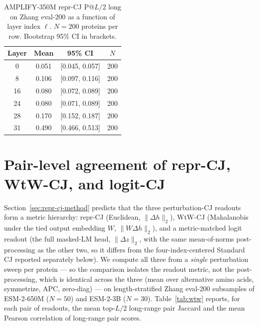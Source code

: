 \documentclass{article}
\begin{document}
\begin{table}[h]
\centering
\small
\caption{AMPLIFY-350M repr-CJ $\text{P}@L/2 \text{ long}$ on Zhang eval-200 as a
function of layer index $\ell$. $N=200$ proteins per row. Bootstrap 95\% CI in
brackets.}
\label{tab:a4}
\begin{tabular}{cccc}
\toprule
Layer & Mean & 95\% CI & $N$ \\
\midrule
0  & 0.051 & [0.045, 0.057] & 200 \\
8  & 0.106 & [0.097, 0.116] & 200 \\
16 & 0.080 & [0.072, 0.089] & 200 \\
24 & 0.080 & [0.071, 0.089] & 200 \\
28 & 0.170 & [0.152, 0.187] & 200 \\
31 & 0.490 & [0.466, 0.513] & 200 \\
\bottomrule
\end{tabular}
\end{table}

\section{Pair-level agreement of repr-CJ, WtW-CJ, and logit-CJ}
\label{app:wtw}

Section~\ref{sec:repr-cj-method} predicts that the three perturbation-CJ
readouts form a metric hierarchy: repr-CJ (Euclidean, $\|\Delta h\|_2$),
WtW-CJ (Mahalanobis under the tied output embedding $W$, $\|W\Delta h\|_2$),
and a metric-matched logit readout (the full masked-LM head,
$\|\Delta z\|_2$, with the same mean-of-norms post-processing as the other
two, so it differs from the four-index-centered Standard CJ reported
separately below). We compute all
three from a \emph{single} perturbation sweep per protein --- so the
comparison isolates the readout metric, not the post-processing, which is
identical across the three (mean over alternative amino acids, symmetrize,
APC, zero-diag) --- on length-stratified Zhang eval-200 subsamples of
ESM-2-650M ($N{=}50$) and ESM-2-3B ($N{=}30$). Table~\ref{tab:wtw} reports,
for each pair of readouts, the mean top-$L/2$ long-range pair Jaccard and
the mean Pearson correlation of long-range pair scores.
\end{document}
